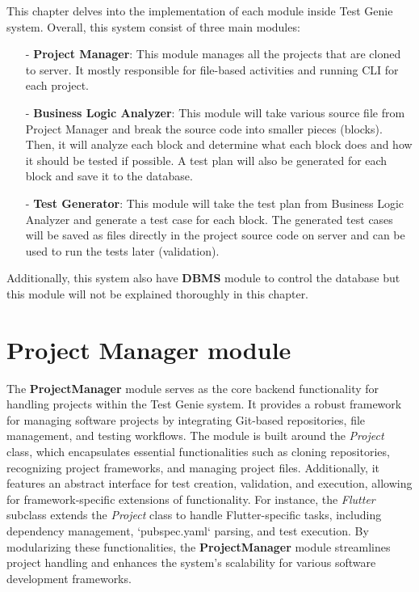 This chapter delves into the implementation of each module inside Test Genie system. Overall, this system consist of three main modules: 
\begin{itemize}
    \item[-] \textbf{Project Manager}: This module manages all the projects that are cloned to server. It mostly responsible for file-based activities and running CLI for each project.
    \item[-] \textbf{Business Logic Analyzer}: This module will take various source file from Project Manager and break the source code into smaller pieces (blocks). Then, it will analyze each block and determine what each block does and how it should be tested if possible. A test plan will also be generated for each block and save it to the database.
    \item[-] \textbf{Test Generator}: This module will take the test plan from Business Logic Analyzer and generate a test case for each block. The generated test cases will be saved as files directly in the project source code on server and can be used to run the tests later (validation).
\end{itemize}
Additionally, this system also have \textbf{DBMS} module to control the database but this module will not be explained thoroughly in this chapter.


\section{Project Manager module}

The \textbf{ProjectManager} module serves as the core backend functionality for handling projects within the Test Genie system. It provides a robust framework for managing software projects by integrating Git-based repositories, file management, and testing workflows. The module is built around the \textit{Project} class, which encapsulates essential functionalities such as cloning repositories, recognizing project frameworks, and managing project files. Additionally, it features an abstract interface for test creation, validation, and execution, allowing for framework-specific extensions of functionality. For instance, the \textit{Flutter} subclass extends the \textit{Project} class to handle Flutter-specific tasks, including dependency management, `pubspec.yaml` parsing, and test execution. By modularizing these functionalities, the \textbf{ProjectManager} module streamlines project handling and enhances the system's scalability for various software development frameworks.

